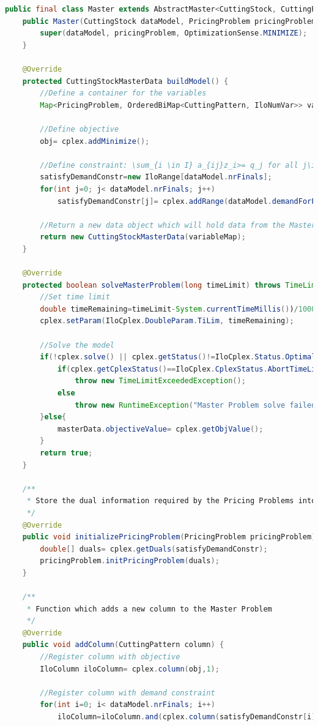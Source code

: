 \documentclass[a4paper]{article}
\newenvironment{myblock}[1]{%
    \tcolorbox[beamer,%
    noparskip,breakable,
    colback=lightBlueCodeBlock,colframe=darkBlueCodeBlock,%
    colbacklower=darkBlueCodeBlock!75!lightBlueCodeBlock,%
    coltitle=blueTitleCodeBlock,
    title=#1]}%
    {\endtcolorbox}
\begin{document}
\begin{myblock}{Master}
\begin{lstlisting}[language=java, style=eclipseArticle, xleftmargin=2em]  
public final class Master extends AbstractMaster<CuttingStock, CuttingPattern, PricingProblem, CuttingStockMasterData> {
	public Master(CuttingStock dataModel, PricingProblem pricingProblem) {
		super(dataModel, pricingProblem, OptimizationSense.MINIMIZE);
	}

	@Override
	protected CuttingStockMasterData buildModel() {
		//Define a container for the variables		
		Map<PricingProblem, OrderedBiMap<CuttingPattern, IloNumVar>> variableMap=...;
		
		//Define objective
		obj= cplex.addMinimize();

		//Define constraint: \sum_{i \in I} a_{ij}z_i>= q_j for all j\in J
		satisfyDemandConstr=new IloRange[dataModel.nrFinals];
		for(int j=0; j< dataModel.nrFinals; j++)
			satisfyDemandConstr[j]= cplex.addRange(dataModel.demandForFinals[j], Integer.MAXVALUE);
		
		//Return a new data object which will hold data from the Master Problem
		return new CuttingStockMasterData(variableMap);
	}

	@Override
	protected boolean solveMasterProblem(long timeLimit) throws TimeLimitExceededException {
		//Set time limit
		double timeRemaining=timeLimit-System.currentTimeMillis())/1000.0;
		cplex.setParam(IloCplex.DoubleParam.TiLim, timeRemaining);
			
		//Solve the model
		if(!cplex.solve() || cplex.getStatus()!=IloCplex.Status.Optimal){
			if(cplex.getCplexStatus()==IloCplex.CplexStatus.AbortTimeLim)
				throw new TimeLimitExceededException();
			else
				throw new RuntimeException("Master Problem solve failed!");
		}else{
			masterData.objectiveValue= cplex.getObjValue();
		}
		return true;
	}

	/**
	 * Store the dual information required by the Pricing Problems into the Pricing Problem object
	 */
	@Override
	public void initializePricingProblem(PricingProblem pricingProblem){
		double[] duals= cplex.getDuals(satisfyDemandConstr);
		pricingProblem.initPricingProblem(duals);
	}

	/**
	 * Function which adds a new column to the Master Problem
	 */
	@Override
	public void addColumn(CuttingPattern column) {
		//Register column with objective
		IloColumn iloColumn= cplex.column(obj,1);
		
		//Register column with demand constraint
		for(int i=0; i< dataModel.nrFinals; i++)
			iloColumn=iloColumn.and(cplex.column(satisfyDemandConstr[i], column.yieldVector[i]));
			

\end{lstlisting}
\end{myblock}
\end{document}
